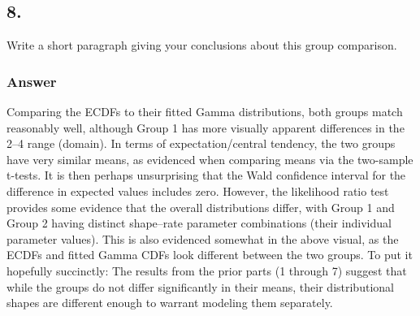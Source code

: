 \documentclass[
]{article}
\begin{document}
\newpage

\subsection{8.}\label{section-7}

Write a short paragraph giving your conclusions about this group
comparison.

\subsubsection{Answer}\label{answer-7}

Comparing the ECDFs to their fitted Gamma distributions, both groups
match reasonably well, although Group 1 has more visually apparent
differences in the 2--4 range (domain). In terms of expectation/central
tendency, the two groups have very similar means, as evidenced when
comparing means via the two-sample t-tests. It is then perhaps
unsurprising that the Wald confidence interval for the difference in
expected values includes zero. However, the likelihood ratio test
provides some evidence that the overall distributions differ, with Group
1 and Group 2 having distinct shape--rate parameter combinations (their
individual parameter values). This is also evidenced somewhat in the
above visual, as the ECDFs and fitted Gamma CDFs look different between
the two groups. To put it hopefully succinctly: The results from the
prior parts (1 through 7) suggest that while the groups do not differ
significantly in their means, their distributional shapes are different
enough to warrant modeling them separately.
\end{document}
